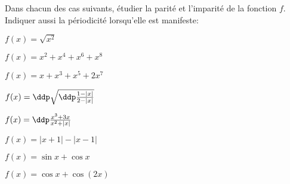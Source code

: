 
\begin{exercice}  \;
Dans chacun des cas suivants, \'etudier la parit\'e et l'imparit\'e de la fonction $f$. Indiquer aussi la p\'eriodicit\'e lorsqu'elle est manifeste:
\begin{enumerate}
\begin{minipage}[t]{0.4\textwidth}
 \item $f(x)=\sqrt{x^2}$ 
\item $f(x)=x^2+x^4+x^6+x^8$ 
\item $f(x)=x+x^3+x^5+2x^7$ 
\item $f(x)=\ddp\sqrt{\ddp\frac{1-|x|}{2-|x|}}$ 
\end{minipage}
\begin{minipage}[t]{0.4\textwidth}
\item $f(x)=\ddp\frac{x^3+3x}{x^2+|x|}$ 
\item $f(x)=|x+1|-|x-1|$ 
\item $f(x)=\sin{x}+\cos{x}$ 
\item $f(x)=\cos{x}+\cos{(2x)}$ 
\end{minipage}
\end{enumerate}
\end{exercice}
